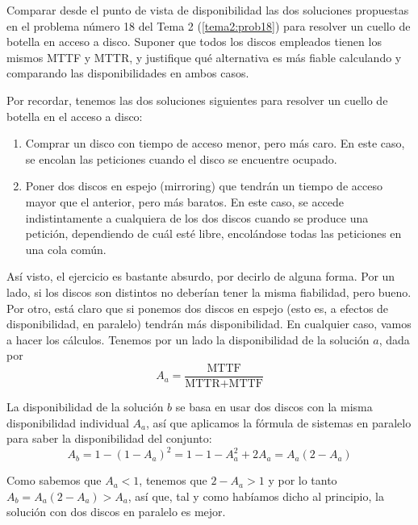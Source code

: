 \begin{problem}[9]
Comparar desde el punto de vista de disponibilidad las dos soluciones propuestas en el problema número 18 del Tema 2 (\ref{tema2:prob18}) para resolver un cuello de botella en acceso a disco. Suponer que todos los discos empleados tienen los mismos MTTF y MTTR, y justifique qué alternativa es más fiable calculando y comparando las disponibilidades en ambos casos.

\solution
{}

Por recordar, tenemos las dos soluciones siguientes para resolver un cuello de botella en el acceso a disco:

\begin{enumerate}
\item Comprar un disco con tiempo de acceso menor, pero más caro. En este caso, se encolan las peticiones cuando el disco se encuentre ocupado.
\item Poner dos discos en espejo (mirroring) que tendrán un tiempo de acceso mayor que el anterior, pero más baratos. En este caso, se accede indistintamente a cualquiera de los dos discos cuando se produce una petición, dependiendo de cuál esté libre, encolándose todas las peticiones en una cola común.
\end{enumerate}

Así visto, el ejercicio es bastante absurdo, por decirlo de alguna forma. Por un lado, si los discos son distintos no deberían tener la misma fiabilidad, pero bueno. Por otro, está claro que si ponemos dos discos en espejo (esto es, a efectos de disponibilidad, en paralelo) tendrán más disponibilidad. En cualquier caso, vamos a hacer los cálculos. Tenemos por un lado la disponibilidad de la solución $a$, dada por \[ A_a = \frac{\text{MTTF}}{\text{MTTR} + \text{MTTF}} \]

La disponibilidad de la solución $b$ se basa en usar dos discos con la misma disponibilidad individual $A_a$, así que aplicamos la fórmula de sistemas en paralelo para saber la disponibilidad del conjunto: \[ A_b = 1 - (1- A_a)^2 = 1 - 1 - A_a^2 + 2A_a = A_a(2 - A_a) \]

Como sabemos que $A_a < 1$, tenemos que $2 - A_a > 1$ y por lo tanto $A_b = A_a(2-A_a) > A_a$, así que, tal y como habíamos dicho al principio, la solución con dos discos en paralelo es mejor.

\end{problem}

